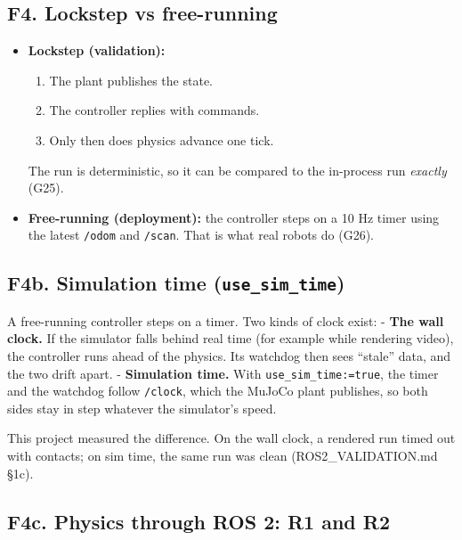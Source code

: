 \documentclass[
  10.5pt,
  a4paper,
]{article}
\providecommand{\tightlist}{%
  \setlength{\itemsep}{0pt}\setlength{\parskip}{0pt}}
\begin{document}
\hypertarget{f4.-lockstep-vs-free-running}{%
\subsection{F4. Lockstep vs
free-running}\label{f4.-lockstep-vs-free-running}}

\begin{itemize}
\tightlist
\item
  \textbf{Lockstep (validation):}

  \begin{enumerate}
  \def\labelenumi{\arabic{enumi}.}
  \tightlist
  \item
    The plant publishes the state.
  \item
    The controller replies with commands.
  \item
    Only then does physics advance one tick.
  \end{enumerate}

  The run is deterministic, so it can be compared to the in-process run
  \emph{exactly} (G25).
\item
  \textbf{Free-running (deployment):} the controller steps on a 10 Hz
  timer using the latest \texttt{/odom} and \texttt{/scan}. That is what
  real robots do (G26).
\end{itemize}

\hypertarget{f4b.-simulation-time-use_sim_time}{%
\subsection{\texorpdfstring{F4b. Simulation time
(\texttt{use\_sim\_time})}{F4b. Simulation time (use\_sim\_time)}}\label{f4b.-simulation-time-use_sim_time}}

A free-running controller steps on a timer. Two kinds of clock exist: -
\textbf{The wall clock.} If the simulator falls behind real time (for
example while rendering video), the controller runs ahead of the
physics. Its watchdog then sees ``stale'' data, and the two drift apart.
- \textbf{Simulation time.} With \texttt{use\_sim\_time:=true}, the
timer and the watchdog follow \texttt{/clock}, which the MuJoCo plant
publishes, so both sides stay in step whatever the simulator's speed.

This project measured the difference. On the wall clock, a rendered run
timed out with contacts; on sim time, the same run was clean
(ROS2\_VALIDATION.md §1c).

\hypertarget{f4c.-physics-through-ros-2-r1-and-r2}{%
\subsection{F4c. Physics through ROS 2: R1 and
R2}\label{f4c.-physics-through-ros-2-r1-and-r2}}
\end{document}
